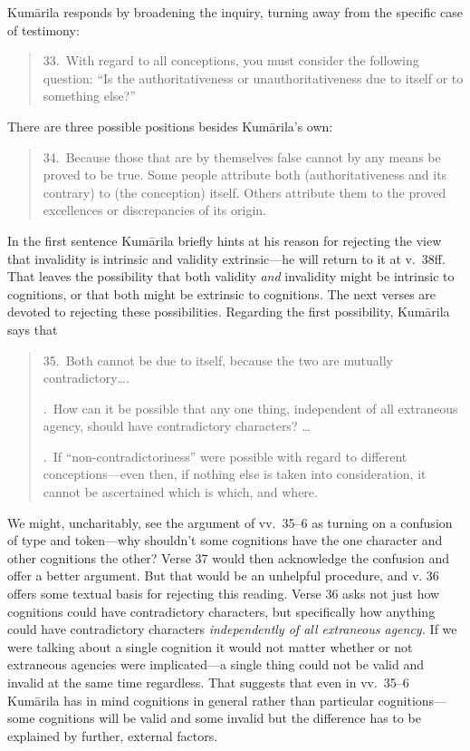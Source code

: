 ﻿\documentclass[11pt]{amsart}
\begin{document}
Kum\=arila responds by broadening the inquiry, turning away from the specific case of testimony:\small \begin{quote}33.~With regard to all conceptions, you must consider the following question: ``Is the authoritativeness or unauthoritativeness due to itself or to something else?''\end{quote} \normalsize There are three possible positions besides Kum\=arila's own:\small\begin{quote}34.~Because those that are by themselves false cannot by any means be proved to be true. Some people attribute both (authoritativeness and its contrary) to (the conception) itself. Others attribute them to the proved excellences or discrepancies of its origin.\end{quote}\normalsize In the first sentence Kum\=arila briefly hints at his reason for rejecting the view that invalidity is intrinsic and validity extrinsic---he will return to it at v.~38ff. That leaves the possibility that both validity \emph{and} invalidity might be intrinsic to cognitions, or that both might be extrinsic to cognitions. The next verses are devoted to rejecting these possibilities. Regarding the first possibility, Kum\=arila says that\small \begin{quote}35.~Both cannot be due to itself, because the two are mutually contradictory\ldots.

.~How can it be possible that any one thing, independent of all extraneous agency, should have contradictory characters? \ldots

.~If ``non-contradictoriness'' were possible with regard to different conceptions---even then, if nothing else is taken into consideration, it cannot be ascertained which is which, and where.\end{quote}\normalsize We might, uncharitably, see the argument of vv.~35--6 as turning on a confusion of type and token---why shouldn't some cognitions have the one character and other cognitions the other? Verse 37 would then acknowledge the confusion and offer a better argument. But that would be an unhelpful procedure, and v. 36 offers some textual basis for rejecting this reading. Verse 36 asks not just how cognitions could have contradictory characters, but specifically how anything could have contradictory characters \emph{independently of all extraneous agency.} If we were talking about a single cognition it would not matter whether or not extraneous agencies were implicated---a single thing could not be valid and invalid at the same time regardless. That suggests that even in vv.~35--6 Kum\=arila has in mind cognitions in general rather than particular cognitions---some cognitions will be valid and some invalid but the difference has to be explained by further, external factors.
\end{document}
